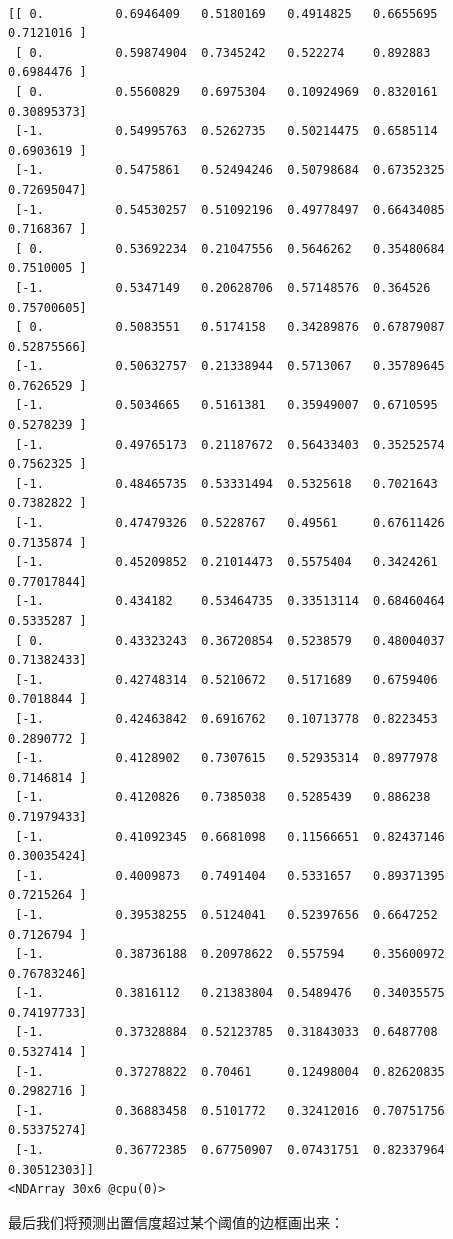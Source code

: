 \documentclass[11pt]{article}
\begin{document}
    \begin{Verbatim}[commandchars=\\\{\}]

[[ 0.          0.6946409   0.5180169   0.4914825   0.6655695   0.7121016 ]
 [ 0.          0.59874904  0.7345242   0.522274    0.892883    0.6984476 ]
 [ 0.          0.5560829   0.6975304   0.10924969  0.8320161   0.30895373]
 [-1.          0.54995763  0.5262735   0.50214475  0.6585114   0.6903619 ]
 [-1.          0.5475861   0.52494246  0.50798684  0.67352325  0.72695047]
 [-1.          0.54530257  0.51092196  0.49778497  0.66434085  0.7168367 ]
 [ 0.          0.53692234  0.21047556  0.5646262   0.35480684  0.7510005 ]
 [-1.          0.5347149   0.20628706  0.57148576  0.364526    0.75700605]
 [ 0.          0.5083551   0.5174158   0.34289876  0.67879087  0.52875566]
 [-1.          0.50632757  0.21338944  0.5713067   0.35789645  0.7626529 ]
 [-1.          0.5034665   0.5161381   0.35949007  0.6710595   0.5278239 ]
 [-1.          0.49765173  0.21187672  0.56433403  0.35252574  0.7562325 ]
 [-1.          0.48465735  0.53331494  0.5325618   0.7021643   0.7382822 ]
 [-1.          0.47479326  0.5228767   0.49561     0.67611426  0.7135874 ]
 [-1.          0.45209852  0.21014473  0.5575404   0.3424261   0.77017844]
 [-1.          0.434182    0.53464735  0.33513114  0.68460464  0.5335287 ]
 [ 0.          0.43323243  0.36720854  0.5238579   0.48004037  0.71382433]
 [-1.          0.42748314  0.5210672   0.5171689   0.6759406   0.7018844 ]
 [-1.          0.42463842  0.6916762   0.10713778  0.8223453   0.2890772 ]
 [-1.          0.4128902   0.7307615   0.52935314  0.8977978   0.7146814 ]
 [-1.          0.4120826   0.7385038   0.5285439   0.886238    0.71979433]
 [-1.          0.41092345  0.6681098   0.11566651  0.82437146  0.30035424]
 [-1.          0.4009873   0.7491404   0.5331657   0.89371395  0.7215264 ]
 [-1.          0.39538255  0.5124041   0.52397656  0.6647252   0.7126794 ]
 [-1.          0.38736188  0.20978622  0.557594    0.35600972  0.76783246]
 [-1.          0.3816112   0.21383804  0.5489476   0.34035575  0.74197733]
 [-1.          0.37328884  0.52123785  0.31843033  0.6487708   0.5327414 ]
 [-1.          0.37278822  0.70461     0.12498004  0.82620835  0.2982716 ]
 [-1.          0.36883458  0.5101772   0.32412016  0.70751756  0.53375274]
 [-1.          0.36772385  0.67750907  0.07431751  0.82337964  0.30512303]]
<NDArray 30x6 @cpu(0)>

    \end{Verbatim}

    最后我们将预测出置信度超过某个阈值的边框画出来：
\end{document}
